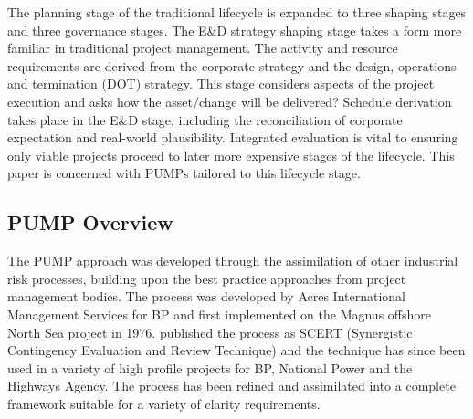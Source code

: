 The planning stage of the traditional lifecycle is expanded to three shaping stages and three governance stages.
The E\&D strategy shaping stage takes a form more familiar in traditional project management.
The activity and resource requirements are derived from the corporate strategy and the design, operations and termination (DOT) strategy. %
This stage considers aspects of the project execution and asks how the asset/change will be delivered?
Schedule derivation takes place in the E\&D stage, including the reconciliation of corporate expectation and real-world plausibility.
Integrated evaluation is vital to ensuring only viable projects proceed to later more expensive stages of the lifecycle.
This paper is concerned with PUMPs tailored to this lifecycle stage.



\subsection{PUMP Overview}

The PUMP approach was developed through the assimilation of other industrial risk processes, building upon the best practice approaches from project management bodies.
The process was developed by Acres International Management Services for BP and first implemented on the Magnus offshore North Sea project in 1976. 
\citet{SCERT} published the process as SCERT (Synergistic Contingency Evaluation and Review Technique) and the technique has since been used in a variety of high profile projects for BP, National Power and the Highways Agency.
The process has been refined and assimilated into a complete framework suitable for a variety of clarity requirements.


